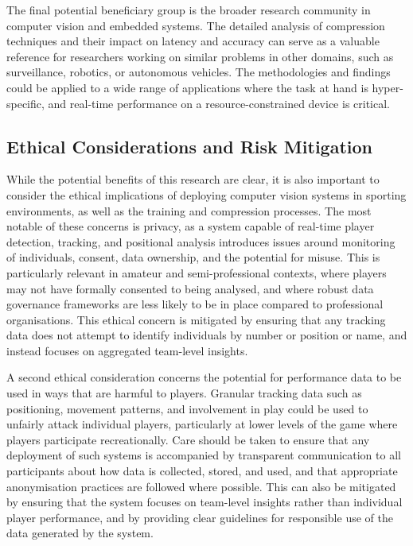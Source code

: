 The final potential beneficiary group is the broader research community in computer vision and embedded systems. The detailed analysis of compression techniques and their impact on latency and accuracy can serve as a valuable reference for researchers working on similar problems in other domains, such as surveillance, robotics, or autonomous vehicles. The methodologies and findings could be applied to a wide range of applications where the task at hand is hyper-specific, and real-time performance on a resource-constrained device is critical.

\subsection{Ethical Considerations and Risk Mitigation}

While the potential benefits of this research are clear, it is also important to consider the ethical implications of deploying computer vision systems in sporting environments, as well as the training and compression processes. The most notable of these concerns is privacy, as a system capable of real-time player detection, tracking, and positional analysis introduces issues around monitoring of individuals, consent, data ownership, and the potential for misuse. This is particularly relevant in amateur and semi-professional contexts, where players may not have formally consented to being analysed, and where robust data governance frameworks are less likely to be in place compared to professional organisations. This ethical concern is mitigated by ensuring that any tracking data does not attempt to identify individuals by number or position or name, and instead focuses on aggregated team-level insights. 

A second ethical consideration concerns the potential for performance data to be used in ways that are harmful to players. Granular tracking data such as positioning, movement patterns, and involvement in play could be used to unfairly attack individual players, particularly at lower levels of the game where players participate recreationally. Care should be taken to ensure that any deployment of such systems is accompanied by transparent communication to all participants about how data is collected, stored, and used, and that appropriate anonymisation practices are followed where possible. This can also be mitigated by ensuring that the system focuses on team-level insights rather than individual player performance, and by providing clear guidelines for responsible use of the data generated by the system.

